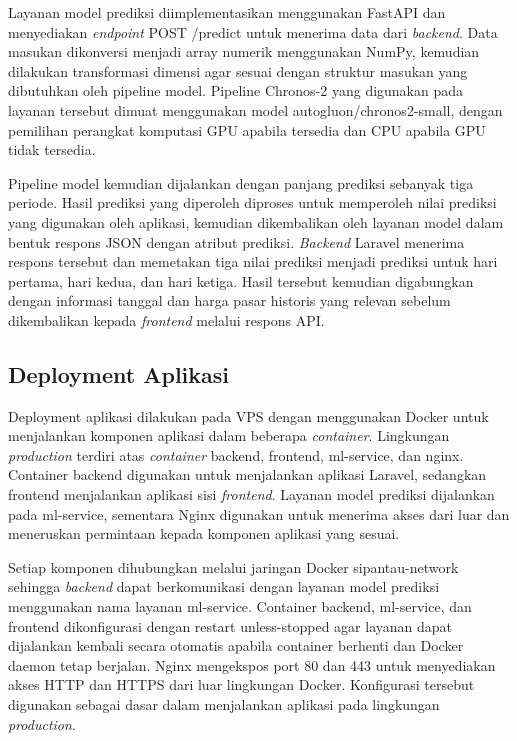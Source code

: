 Layanan model prediksi diimplementasikan menggunakan FastAPI dan menyediakan \textit{endpoint} POST /predict untuk menerima data dari \textit{backend}. Data masukan dikonversi menjadi array numerik menggunakan NumPy, kemudian dilakukan transformasi dimensi agar sesuai dengan struktur masukan yang dibutuhkan oleh pipeline model. Pipeline Chronos-2 yang digunakan pada layanan tersebut dimuat menggunakan model autogluon/chronos2-small, dengan pemilihan perangkat komputasi GPU apabila tersedia dan CPU apabila GPU tidak tersedia.

Pipeline model kemudian dijalankan dengan panjang prediksi sebanyak tiga periode. Hasil prediksi yang diperoleh diproses untuk memperoleh nilai prediksi yang digunakan oleh aplikasi, kemudian dikembalikan oleh layanan model dalam bentuk respons JSON dengan atribut prediksi. \textit{Backend} Laravel menerima respons tersebut dan memetakan tiga nilai prediksi menjadi prediksi untuk hari pertama, hari kedua, dan hari ketiga. Hasil tersebut kemudian digabungkan dengan informasi tanggal dan harga pasar historis yang relevan sebelum dikembalikan kepada \textit{frontend} melalui respons API.

\subsection{Deployment Aplikasi}

Deployment aplikasi dilakukan pada VPS dengan menggunakan Docker untuk menjalankan komponen aplikasi dalam beberapa \textit{container}. Lingkungan \textit{production} terdiri atas \textit{container} backend, frontend, ml-service, dan nginx. Container backend digunakan untuk menjalankan aplikasi Laravel, sedangkan frontend menjalankan aplikasi sisi \textit{frontend}. Layanan model prediksi dijalankan pada ml-service, sementara Nginx digunakan untuk menerima akses dari luar dan meneruskan permintaan kepada komponen aplikasi yang sesuai.

Setiap komponen dihubungkan melalui jaringan Docker sipantau-network sehingga \textit{backend} dapat berkomunikasi dengan layanan model prediksi menggunakan nama layanan ml-service. Container backend, ml-service, dan frontend dikonfigurasi dengan restart unless-stopped agar layanan dapat dijalankan kembali secara otomatis apabila container berhenti dan Docker daemon tetap berjalan. Nginx mengekspos port 80 dan 443 untuk menyediakan akses HTTP dan HTTPS dari luar lingkungan Docker. Konfigurasi tersebut digunakan sebagai dasar dalam menjalankan aplikasi pada lingkungan \textit{production}.

